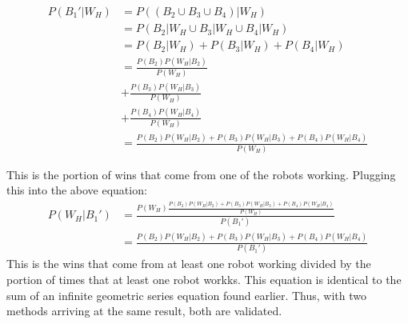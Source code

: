 \documentclass[11pt]{article}
\begin{document}
\begin{align*}
    P(B_1' | W_H) &= P((B_2 \cup B_3 \cup B_4)| W_H)\\
    &= P(B_2 | W_H \cup B_3 | W_H \cup B_4 | W_H) \\
    &=P(B_2 | W_H) + P(B_3 | W_H) + P(B_4 | W_H)\\
    &= \frac{P(B_2) P(W_H | B_2)}{P(W_H)}\\
    &+ \frac{P(B_3)P(W_H | B_3)}{P(W_H)}\\
    &+ \frac{P(B_4)P(W_H | B_4)}{P(W_H)}\\
    &= \frac{P(B_2) P(W_H | B_2) + P(B_3)P(W_H | B_3) + P(B_4)P(W_H | B_4)}{P(W_H)}
\end{align*}

This is the portion of wins that come from one of the robots working. Plugging this 
into the above equation:
\begin{align*}
    P(W_H | B_1') &= \frac{P(W_H) \frac{P(B_2) P(W_H | B_2) + P(B_3)P(W_H | B_3) + P(B_4)P(W_H | B_4)}{P(W_H)}}{P(B_1')}\\
    &= \frac{P(B_2) P(W_H | B_2) + P(B_3)P(W_H | B_3) + P(B_4)P(W_H | B_4)}{P(B_1')}
\end{align*}
This is the wins that come from at least one robot working divided by the portion of times that at least
one robot workks. This equation is identical to the sum of an infinite geometric series equation found earlier.
Thus, with two methods arriving at the same result, both are validated.
\end{document}
